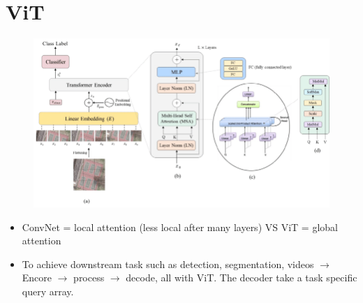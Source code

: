 \documentclass{article}
\theoremstyle{plain}%
\theoremstyle{definition}
\theoremstyle{remark}
\begin{document}
\section{ViT}
\begin{figure}[H]
    \centering
    \includegraphics*[width=.8\textwidth]{figs/The-Vision-Transformer-architecture-a-the-main-architecture-of-the-model-b-the.png}
\end{figure}
\begin{itemize}
    \item ConvNet = local attention (less local after many layers) VS ViT = global attention 
    \item To achieve downstream task such as detection, segmentation, videos $\rightarrow$ Encore $\rightarrow$ process $\rightarrow$ decode, all with ViT. The decoder take a task specific query array. 
\end{itemize}
\end{document}
